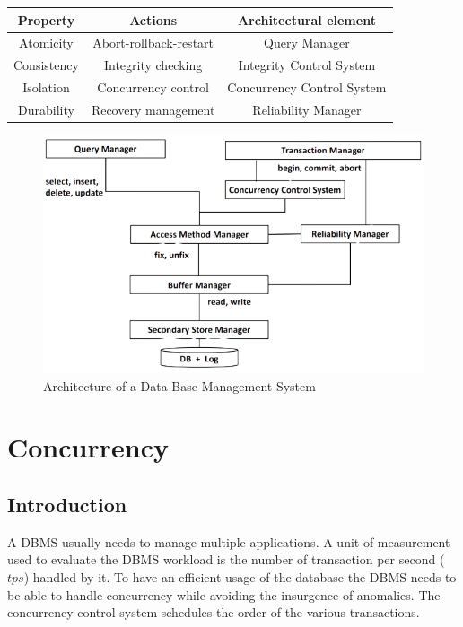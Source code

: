 \documentclass[12pt, a4paper]{report}
\newtheorem[style=M,bodystyle=\normalfont]{theorem}{Theorem}
\newtheorem[style=M,bodystyle=\normalfont]{corollary}{Corollary}
\newtheorem[style=M,bodystyle=\normalfont]{lemma}{Lemma}
\newtheorem[style=M,bodystyle=\normalfont]{definition}{Definition}
\begin{document}
    \begin{table}[H]
        \centering
        \begin{tabular}{c|c|c}
        \textbf{Property} & \textbf{Actions}       & \textbf{Architectural element} \\ \hline
        Atomicity         & Abort-rollback-restart & Query Manager                  \\
        Consistency       & Integrity checking     & Integrity Control System       \\
        Isolation         & Concurrency control    & Concurrency Control System     \\
        Durability        & Recovery management    & Reliability Manager           
        \end{tabular}
    \end{table}
    \begin{figure}[H]
        \centering
        \includegraphics[width=0.75\linewidth]{images/architecture.png}
        \caption{Architecture of a Data Base Management System}
    \end{figure}

\newpage

\chapter{Concurrency}
    \section{Introduction}
    A DBMS usually needs to manage multiple applications. A unit of measurement used to evaluate the DBMS workload is the number of transaction per second ($tps$) handled by it. 
    To have an efficient usage of the database the DBMS needs to be able to handle concurrency while avoiding the insurgence of anomalies. 
    The concurrency control system schedules the order of the various transactions. 
    
\end{document}
